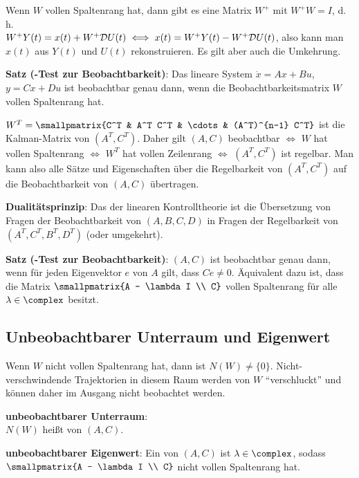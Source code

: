 \linie

Wenn $W$ vollen Spaltenrang hat, dann gibt es eine Matrix $W^+$ mit $W^+ W = I$,
d.\,h.\\
$W^+ Y(t) = x(t) + W^+ \mathcal{D} U(t) \iff x(t) = W^+ Y(t) - W^+ \mathcal{D} U(t)$,
also kann man $x(t)$ aus $Y(t)$ und $U(t)$ rekonstruieren.
Es gilt aber auch die Umkehrung.

\textbf{Satz (-Test zur Beobachtbarkeit)}:
Das lineare System $\dot{x} = Ax + Bu$, $y = Cx + Du$ ist beobachtbar genau dann,
wenn die Beobachtbarkeitsmatrix $W$ vollen Spaltenrang hat.

$W^T = \smallpmatrix{C^T & A^T C^T & \cdots & (A^T)^{n-1} C^T}$ ist die Kalman-Matrix
von $(A^T, C^T)$.
Daher gilt $(A, C)$ beobachtbar $\iff$ $W$ hat vollen Spaltenrang $\iff$ $W^T$ hat vollen
Zeilenrang $\iff$ $(A^T, C^T)$ ist regelbar.
Man kann also alle Sätze und Eigenschaften über die Regelbarkeit von $(A^T, C^T)$ auf
die Beobachtbarkeit von $(A, C)$ übertragen.

\textbf{Dualitätsprinzip}:
Das 
der linearen Kontrolltheorie ist die Übersetzung von Fragen
der Beobachtbarkeit von $(A, B, C, D)$ in Fragen der Regelbarkeit von $(A^T, C^T, B^T, D^T)$
(oder umgekehrt).

\textbf{Satz (-Test zur Beobachtbarkeit)}:
$(A, C)$ ist beobachtbar genau dann, wenn für jeden Eigenvektor $e$ von $A$ gilt,
dass $Ce \not= 0$.
Äquivalent dazu ist, dass die Matrix $\smallpmatrix{A - \lambda I \\ C}$
vollen Spaltenrang für alle $\lambda \in \complex$ besitzt.

\pagebreak

\subsection{%
    Unbeobachtbarer Unterraum und Eigenwert%
}

Wenn $W$ nicht vollen Spaltenrang hat, dann ist $N(W) \not= \{0\}$.
Nicht-verschwindende Trajektorien in diesem Raum werden von $W$ "`verschluckt"'
und können daher im Ausgang nicht beobachtet werden.

\textbf{unbeobachtbarer Unterraum}:\\
$N(W)$ heißt  von $(A, C)$.

\textbf{unbeobachtbarer Eigenwert}:
Ein  von $(A, C)$ ist
$\lambda \in \complex$, sodass $\smallpmatrix{A - \lambda I \\ C}$ nicht vollen Spaltenrang hat.

